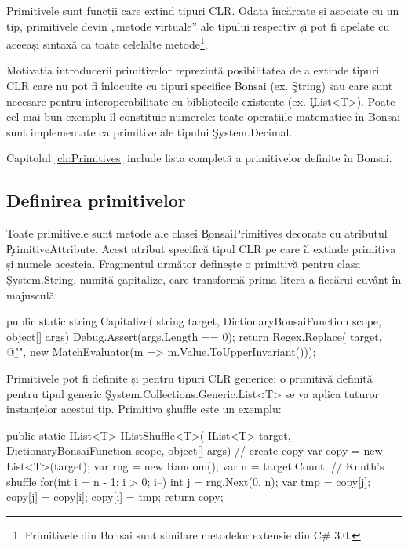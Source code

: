 \documentclass[12pt,a4paper]{memoir}
\begin{document}
Primitivele sunt funcții care extind tipuri CLR. Odata încărcate și asociate cu un tip, primitivele devin „metode virtuale” ale tipului respectiv și pot fi apelate cu aceeași sintaxă ca toate celelalte metode\footnote{Primitivele din Bonsai sunt similare metodelor extensie din C\# 3.0.}.

Motivația introducerii primitivelor reprezintă posibilitatea de a extinde tipuri CLR care nu pot fi înlocuite cu tipuri specifice Bonsai (ex. \c{String}) sau care sunt necesare pentru interoperabilitate cu bibliotecile existente (ex. \c{IList<T>}). Poate cel mai bun exemplu îl constituie numerele: toate operațiile matematice în Bonsai sunt implementate ca primitive ale tipului \c{System.Decimal}.

Capitolul \ref{ch:Primitives} include lista completă a primitivelor definite în Bonsai.

\subsection{Definirea primitivelor}

Toate primitivele sunt metode ale clasei \c{BonsaiPrimitives} decorate cu atributul \c{PrimitiveAttribute}. Acest atribut specifică tipul CLR pe care îl extinde primitiva și numele acesteia. Fragmentul următor definește o primitivă pentru clasa \c{System.String}, numită \c{capitalize}, care transformă prima literă a fiecărui cuvânt în majusculă:
\begin{code}
public static string Capitalize(
  string target,
  DictionaryBonsaiFunction scope,
  object[] args)
{
  Debug.Assert(args.Length == 0);
  return Regex.Replace(
    target, @"\b\w",
    new MatchEvaluator(m => m.Value.ToUpperInvariant()));
}
\end{code}

Primitivele pot fi definite și pentru tipuri CLR generice: o primitivă definită pentru tipul generic \c{System.Collections.Generic.List<T>} se va aplica tuturor instanțelor acestui tip. Primitiva \c{shuffle} este un exemplu:
\begin{code}
public static IList<T> IListShuffle<T>(
  IList<T> target,
  DictionaryBonsaiFunction scope,
  object[] args)
{
  // create copy
  var copy = new List<T>(target);
  var rng = new Random();
  var n = target.Count;
  // Knuth's shuffle
  for(int i = n - 1; i > 0; i--) {
    int j = rng.Next(0, n);
    var tmp = copy[j];
    copy[j] = copy[i];
    copy[i] = tmp;
  }
  return copy;
}
\end{code}
\end{document}
